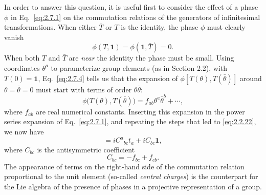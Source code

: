 In order to answer this question, it is useful first to consider the effect of
a phase $\phi$ in Eq.~\eqref{eq:2.7.1} on the commutation relations of the generators of
infinitesimal transformations. When either $\bar T$ or $T$ is the identity, the
phase $\phi$ must clearly vanish
\begin{equation}
  \phi(T,\mathbf{1})=\phi(\mathbf{1},\bar T)=0.
  \tag{2.7.4}\label{eq:2.7.4}
\end{equation}
When both $T$ and $\bar T$ are \emph{near} the identity the phase must be small.
Using coordinates $\theta^a$ to parameterize group elements (as in Section
2.2), with $T(0)=\mathbf{1}$, Eq.~\eqref{eq:2.7.4} tells us that the expansion of
$\phi[T(\theta),T(\bar\theta)]$ around $\theta=\bar\theta=0$ must start with
terms of order $\theta\bar\theta$:
\begin{equation}
  \phi\bigl(T(\theta),T(\bar\theta)\bigr)
    =f_{ab}\theta^a\bar\theta^b+\cdots,
  \tag{2.7.5}\label{eq:2.7.5}
\end{equation}
where $f_{ab}$ are real numerical constants. Inserting this expansion in the
power series expansion of Eq.~\eqref{eq:2.7.1}, and repeating the steps that led to
\eqref{eq:2.2.22}, we now have
\begin{equation}
  [t_b,t_c]=iC^a{}_{bc}t_a+iC_{bc}\mathbf{1},
  \tag{2.7.6}\label{eq:2.7.6}
\end{equation}
where $C_{bc}$ is the antisymmetric coefficient
\begin{equation}
  C_{bc}=-f_{bc}+f_{cb}.
  \tag{2.7.7}\label{eq:2.7.7}
\end{equation}
The appearance of terms on the right-hand side of the commutation relation
proportional to the unit element (so-called \emph{central charges}) is the
counterpart for the Lie algebra of the presence of phases in a projective
representation of a group.


